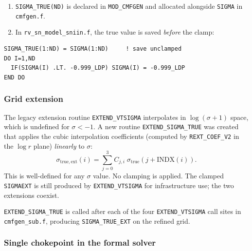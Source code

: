\documentclass[11pt,a4paper]{article}
\begin{document}
\begin{enumerate}[noitemsep]
  \item \texttt{SIGMA\_TRUE(ND)} is declared in \texttt{MOD\_CMFGEN}
        and allocated alongside \texttt{SIGMA} in \texttt{cmfgen.f}.
  \item In \texttt{rv\_sn\_model\_sniin.f}, the true value is saved
        \emph{before} the clamp:
\end{enumerate}
\begin{lstlisting}
SIGMA_TRUE(1:ND) = SIGMA(1:ND)     ! save unclamped
DO I=1,ND
  IF(SIGMA(I) .LT. -0.999_LDP) SIGMA(I) = -0.999_LDP
END DO
\end{lstlisting}

\subsubsection{Grid extension}

The legacy extension routine \texttt{EXTEND\_VTSIGMA} interpolates in
$\log(\sigma + 1)$ space, which is undefined for $\sigma < -1$.  A new
routine \texttt{EXTEND\_SIGMA\_TRUE} was created that applies the cubic
interpolation coefficients (computed by \texttt{REXT\_COEF\_V2} in the
$\log r$ plane) \emph{linearly} to $\sigma$:
\begin{equation}
  \sigma_{\mathrm{true,ext}}(i) = \sum_{j=0}^{3} C_{j,i}\;
  \sigma_{\mathrm{true}}\!\left(j + \mathrm{INDX}(i)\right) .
  \label{eq:extend_sigma_true}
\end{equation}
This is well-defined for any $\sigma$ value.  No clamping is applied.
The clamped \texttt{SIGMAEXT} is still produced by \texttt{EXTEND\_VTSIGMA}
for infrastructure use; the two extensions coexist.

\texttt{EXTEND\_SIGMA\_TRUE} is called after each of the four
\texttt{EXTEND\_VTSIGMA} call sites in \texttt{cmfgen\_sub.f}, producing
\texttt{SIGMA\_TRUE\_EXT} on the refined grid.

\subsubsection{Single chokepoint in the formal solver}
\end{document}
